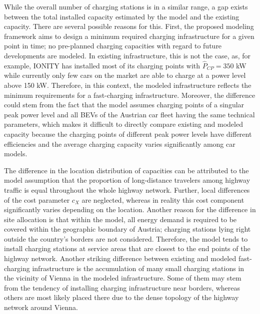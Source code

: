 While the overall number of charging stations is in a similar range, a gap exists between the total installed capacity estimated by the model and the existing capacity. There are several possible reasons for this. First, the proposed modeling framework aims to design a minimum required charging infrastructure for a given point in time; no pre-planned charging capacities with regard to future developments are modeled. In existing infrastructure, this is not the case, as, for example, IONITY has installed most of its charging points with $\hat{P}_{CP}=350$ kW while currently only few cars on the market are able to charge at a power level above 150 kW. Therefore, in this context, the modeled infrastructure reflects the minimum requirements for a fast-charging infrastructure. Moreover, the difference could stem from the fact that the model assumes charging points of a singular peak power level and all \acp{BEV} of the Austrian car fleet having the same technical parameters, which makes it difficult to directly compare existing and modeled capacity because the charging points of different peak power levels have different efficiencies and the average charging capacity varies significantly among car models.

The difference in the location distribution of capacities can be attributed to the model assumption that the proportion of long-distance travelers among highway traffic is equal throughout the whole highway network. Further, local differences of the cost parameter $c_X$ are neglected, whereas in reality this cost component significantly varies depending on the location. Another reason for the difference in site allocation is that within the model, all energy demand is required to be covered within the geographic boundary of Austria; charging stations lying right outside the country's borders are not considered. Therefore, the model tends to install charging stations at service areas that are closest to the end points of the highway network. Another striking difference between existing and modeled fast-charging infrastructure is the accumulation of many small charging stations in the vicinity of Vienna in the modeled infrastructure. Some of them may stem from the tendency of installing charging infrastructure near borders, whereas others are most likely placed there due to the dense topology of the highway network around Vienna.
